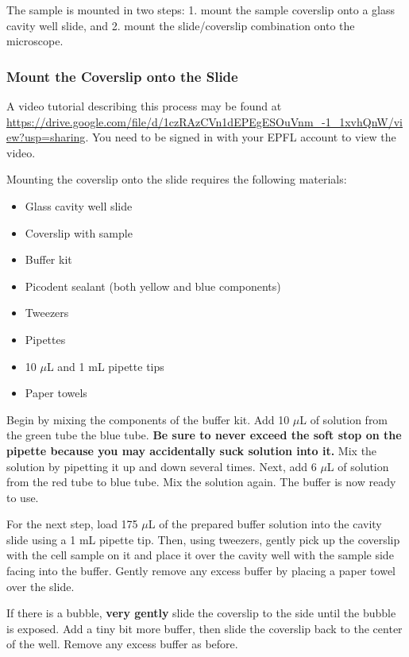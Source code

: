 \documentclass[10pt,a4paper,oneside]{book}
\begin{document}
The sample is mounted in two steps: 1. mount the sample coverslip onto a glass cavity well slide, and 2. mount the slide/coverslip combination onto the microscope.

\subsubsection{Mount the Coverslip onto the Slide}

\newline

A video tutorial describing this process may be found at \url{https://drive.google.com/file/d/1czRAzCVn1dEPEgESOuVnm_-1_1xvhQnW/view?usp=sharing}. You need to be signed in with your EPFL account to view the video.

Mounting the coverslip onto the slide requires the following materials:

\begin{itemize}
    \item{Glass cavity well slide}
    \item{Coverslip with sample}
    \item{Buffer kit}
    \item{Picodent sealant (both yellow and blue components)}
    \item{Tweezers}
    \item{Pipettes}
    \item{10 $\mu$L and 1 mL pipette tips}
    \item{Paper towels}
\end{itemize}

Begin by mixing the components of the buffer kit. Add 10 $\mu$L of solution from the green tube the blue tube. \textbf{Be sure to never exceed the soft stop on the pipette because you may accidentally suck solution into it.} Mix the solution by pipetting it up and down several times. Next, add 6 $\mu$L of solution from the red tube to blue tube. Mix the solution again. The buffer is now ready to use.

For the next step, load 175 $\mu$L of the prepared buffer solution into the cavity slide using a 1 mL pipette tip. Then, using tweezers, gently pick up the coverslip with the cell sample on it and place it over the cavity well with the sample side facing into the buffer. Gently remove any excess buffer by placing a paper towel over the slide.

If there is a bubble, \textbf{very gently} slide the coverslip to the side until the bubble is exposed. Add a tiny bit more buffer, then slide the coverslip back to the center of the well. Remove any excess buffer as before.
\end{document}
